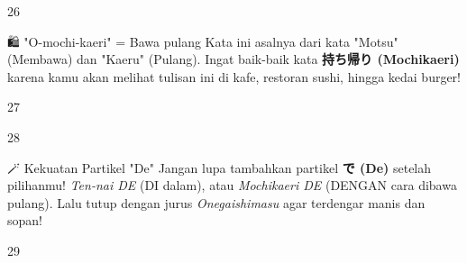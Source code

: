 \begin{convobox}{26}
    \noindent

    \vspace{1.5em}
\end{convobox}

\begin{lessonbox}{🛍️ "O-mochi-kaeri" = Bawa pulang}
    Kata ini asalnya dari kata "Motsu" (Membawa) dan "Kaeru" (Pulang). Ingat baik-baik kata \textbf{持ち帰り (Mochikaeri)} karena kamu akan melihat tulisan ini di kafe, restoran sushi, hingga kedai burger!
\end{lessonbox}

\begin{convobox}{27}
    \noindent
     

    \vspace{1.5em}
\end{convobox}

\begin{convobox}{28}
    \noindent
      

    \vspace{1.5em}
\end{convobox}

\begin{lessonbox}{🪄 Kekuatan Partikel "De"}
    Jangan lupa tambahkan partikel \textbf{で (De)} setelah pilihanmu! \textit{Ten-nai DE} (DI dalam), atau \textit{Mochikaeri DE} (DENGAN cara dibawa pulang). Lalu tutup dengan jurus \textit{Onegaishimasu} agar terdengar manis dan sopan!
\end{lessonbox}

\begin{convobox}{29}
    \noindent

    \vspace{1.5em}
\end{convobox}

